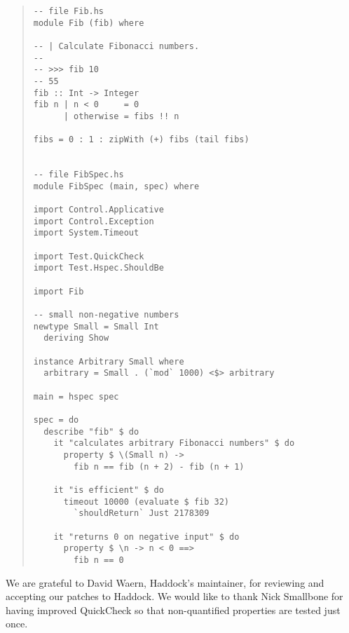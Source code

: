 \documentclass[preprint]{sigplanconf}
\begin{document}
\begin{quote}
\small
\begin{verbatim}
-- file Fib.hs
module Fib (fib) where

-- | Calculate Fibonacci numbers.
--
-- >>> fib 10
-- 55
fib :: Int -> Integer
fib n | n < 0     = 0
      | otherwise = fibs !! n

fibs = 0 : 1 : zipWith (+) fibs (tail fibs)


-- file FibSpec.hs
module FibSpec (main, spec) where

import Control.Applicative
import Control.Exception
import System.Timeout

import Test.QuickCheck
import Test.Hspec.ShouldBe

import Fib

-- small non-negative numbers
newtype Small = Small Int
  deriving Show

instance Arbitrary Small where
  arbitrary = Small . (`mod` 1000) <$> arbitrary

main = hspec spec

spec = do
  describe "fib" $ do
    it "calculates arbitrary Fibonacci numbers" $ do
      property $ \(Small n) ->
        fib n == fib (n + 2) - fib (n + 1)

    it "is efficient" $ do
      timeout 10000 (evaluate $ fib 32)
        `shouldReturn` Just 2178309

    it "returns 0 on negative input" $ do
      property $ \n -> n < 0 ==>
        fib n == 0
\end{verbatim}
\end{quote}

\acks

We are grateful to David Waern, Haddock's maintainer, for reviewing and
accepting our patches to Haddock.
We would like to thank
Nick Smallbone for having improved QuickCheck so that
non-quantified properties are tested just once.




\end{document}
